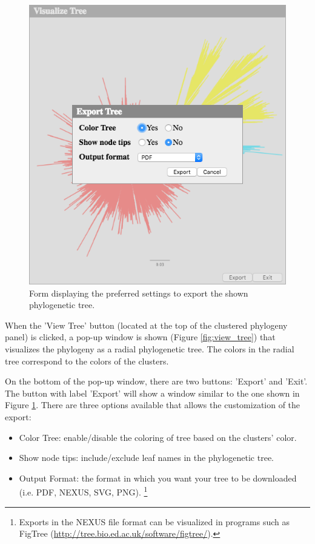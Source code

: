 \documentclass[a4paper, 11pt]{article} %
\begin{document}
\begin{figure}[H]
\centering
\includegraphics[scale=0.50]{images/export_tree.PNG}
\vspace{-0.25cm}
\caption{Form displaying the preferred settings to export the shown phylogenetic tree.}
\label{fig:export_tree}
\end{figure}

When the 'View Tree' button (located at the top of the clustered phylogeny panel) is clicked, a pop-up window is shown (Figure \ref{fig:view_tree}) that visualizes the phylogeny as a radial phylogenetic tree. 
The colors in the radial tree correspond to the colors of the clusters.

\break
\break
On the bottom of the pop-up window, there are two buttons: 'Export' and 'Exit'.
The button with label 'Export' will show a window similar to the one shown in Figure \ref{fig:export_tree}. There are three options available that allows the customization of the export:
\begin{itemize}
\item Color Tree: enable/disable the coloring of tree based on the clusters' color.
\item Show node tips: include/exclude leaf names in the phylogenetic tree.
\item Output Format: the format in which you want your tree to be downloaded (i.e. PDF, NEXUS, SVG, PNG). \footnote{Exports in the NEXUS file format can be visualized in programs such as FigTree (\url{http://tree.bio.ed.ac.uk/software/figtree/}).} 
\end{itemize}
  
\end{document}
